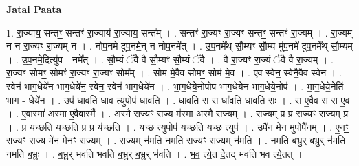 \documentclass[17pt]{extarticle}
\begin{document}
\textbf{Jatai Paata} \newline

1. रा॒ज्याय॒ सन्तꣳ॒॒ सन्तꣳ॑ रा॒ज्याय॑ रा॒ज्याय॒ सन्त᳚म् । . सन्तꣳ॑ रा॒ज्यꣳ रा॒ज्यꣳ सन्तꣳ॒॒ सन्तꣳ॑ रा॒ज्यम् । . रा॒ज्यम् न न रा॒ज्यꣳ रा॒ज्यम् न । . नोप॒नमे॑ दुप॒नमे॒न् न नोप॒नमे᳚त् । . उ॒प॒नमे᳚थ् सौ॒म्यꣳ सौ॒म्य मु॑प॒नमे॑ दुप॒नमे᳚थ् सौ॒म्यम् । . उ॒प॒नमे॒दित्यु॑प - नमे᳚त् । . सौ॒म्यं ॅवै वै सौ॒म्यꣳ सौ॒म्यं ॅवै । . वै रा॒ज्यꣳ रा॒ज्यं ॅवै वै रा॒ज्यम् । . रा॒ज्यꣳ सोमꣳ॒॒ सोमꣳ॑ रा॒ज्यꣳ रा॒ज्यꣳ सोम᳚म् । . सोम॑ मे॒वैव सोमꣳ॒॒ सोम॑ मे॒व । . ए॒व स्वेन॒ स्वेनै॒वैव स्वेन॑ । . स्वेन॑ भाग॒धेये॑न भाग॒धेये॑न॒ स्वेन॒ स्वेन॑ भाग॒धेये॑न । . भा॒ग॒धेये॒नोपोप॑ भाग॒धेये॑न भाग॒धेये॒नोप॑ । . भा॒ग॒धेये॒नेति॑ भाग - धेये॑न । . उप॑ धावति धाव॒ त्युपोप॑ धावति । . धा॒व॒ति॒ स स धा॑वति धावति॒ सः । . स ए॒वैव स स ए॒व । . ए॒वास्मा॑ अस्मा ए॒वैवास्मै᳚ । . अ॒स्मै॒ रा॒ज्यꣳ रा॒ज्य म॑स्मा अस्मै रा॒ज्यम् । . रा॒ज्यम् प्र प्र रा॒ज्यꣳ रा॒ज्यम् प्र । . प्र य॑च्छति यच्छति॒ प्र प्र य॑च्छति । . य॒च्छ॒ त्युपोप॑ यच्छति यच्छ॒ त्युप॑ । . उपै॑न मेन॒ मुपोपै॑नम् । . ए॒नꣳ॒॒ रा॒ज्यꣳ रा॒ज्य मे॑न मेनꣳ रा॒ज्यम् । . रा॒ज्यम् न॑मति नमति रा॒ज्यꣳ रा॒ज्यम् न॑मति । . न॒म॒ति॒ ब॒भ्रुर् ब॒भ्रुर् न॑मति नमति ब॒भ्रुः । . ब॒भ्रुर् भ॑वति भवति ब॒भ्रुर् ब॒भ्रुर् भ॑वति । . भ॒व॒ त्ये॒त दे॒तद् भ॑वति भव त्ये॒तत् । \newline
\end{document}
